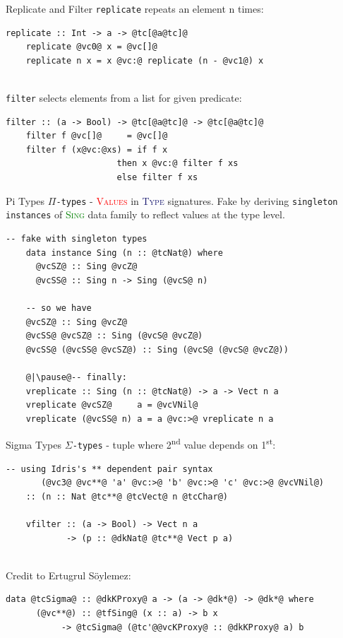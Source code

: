 \documentclass[xcolor={usenames,dvipsnames}]{beamer}
\newcommand{\htycon}[1]{\textcolor{MidnightBlue}{\textsc{#1}}}
\newcommand{\hvalcon}[1]{\textcolor{Red}{\textsc{#1}}}
\newcommand{\htyfam}[1]{\textcolor{Green}{\textsc{#1}}}
\begin{document}
\begin{frame}[fragile]{Replicate and Filter}
  \texttt{replicate} repeats an element n times:
  \begin{lstlisting}[style=hask]
    replicate :: Int -> a -> @tc[@a@tc]@
    replicate @vc0@ x = @vc[]@
    replicate n x = x @vc:@ replicate (n - @vc1@) x
  \end{lstlisting}

  \ \\
  \pause
  \texttt{filter} selects elements from a list for given predicate:
  \begin{lstlisting}[style=hask]
    filter :: (a -> Bool) -> @tc[@a@tc]@ -> @tc[@a@tc]@
    filter f @vc[]@     = @vc[]@
    filter f (x@vc:@xs) = if f x
                      then x @vc:@ filter f xs
                      else filter f xs
  \end{lstlisting}
\end{frame}

\begin{frame}[fragile]{Pi Types}
  \texttt{$\Pi$-types} - \hvalcon{Values} in \htycon{Type} signatures. Fake by deriving \texttt{singleton instances} of \htyfam{Sing} data family to reflect values at the type level.
  \begin{lstlisting}[style=hask]
    -- fake with singleton types
    data instance Sing (n :: @tcNat@) where
      @vcSZ@ :: Sing @vcZ@
      @vcSS@ :: Sing n -> Sing (@vcS@ n)

    -- so we have
    @vcSZ@ :: Sing @vcZ@
    @vcSS@ @vcSZ@ :: Sing (@vcS@ @vcZ@)
    @vcSS@ (@vcSS@ @vcSZ@) :: Sing (@vcS@ (@vcS@ @vcZ@))

    @|\pause@-- finally:
    vreplicate :: Sing (n :: @tcNat@) -> a -> Vect n a
    vreplicate @vcSZ@     a = @vcVNil@
    vreplicate (@vcSS@ n) a = a @vc:>@ vreplicate n a
  \end{lstlisting}
\end{frame}

\begin{frame}[fragile]{Sigma Types}
  \texttt{$\Sigma$-types} - tuple where 2\textsuperscript{nd} value depends on 1\textsuperscript{st}:
  \begin{lstlisting}[style=hask]
    -- using Idris's ** dependent pair syntax
       (@vc3@ @vc**@ 'a' @vc:>@ 'b' @vc:>@ 'c' @vc:>@ @vcVNil@)
    :: (n :: Nat @tc**@ @tcVect@ n @tcChar@)

    vfilter :: (a -> Bool) -> Vect n a
            -> (p :: @dkNat@ @tc**@ Vect p a)
  \end{lstlisting}

  \ \\
  \pause
  Credit to Ertugrul S\"oylemez: 
  \begin{lstlisting}[style=hask]
    data @tcSigma@ :: @dkKProxy@ a -> (a -> @dk*@) -> @dk*@ where
      (@vc**@) :: @tfSing@ (x :: a) -> b x
           -> @tcSigma@ (@tc'@@vcKProxy@ :: @dkKProxy@ a) b
  \end{lstlisting}
\end{frame}
\end{document}
